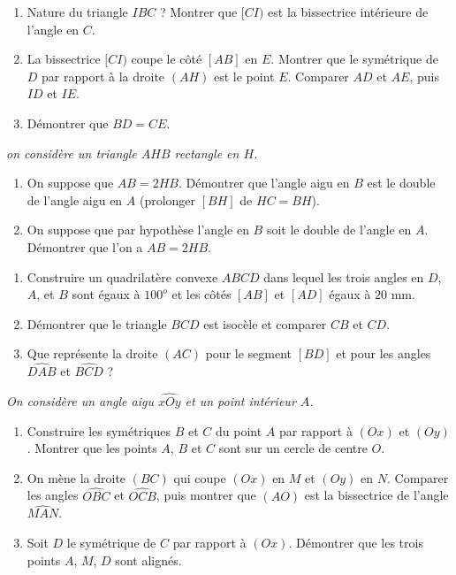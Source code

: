 \begin{itemize}
\begin{enumerate}
\item Nature du triangle $IBC$ ? Montrer que $[CI)$ est la bissectrice intérieure de l'angle en $C$. 
\item La bissectrice $[CI)$ coupe le côté $[AB]$ en $E$. Montrer que le symétrique de $D$ par rapport à la droite $(AH)$ est le point $E$. Comparer $AD$ et $AE$, puis $ID$ et $IE$. 
\item Démontrer que $BD=CE$.
\end{enumerate}
\it on considère un triangle $AHB$ rectangle en $H$. 
\begin{enumerate}
\item On suppose que $AB=2HB$. Démontrer que l'angle aigu en $B$ est le double de l'angle aigu en $A$ (prolonger $[BH]$ de $HC=BH$).
\item On suppose que par hypothèse l'angle en $B$ soit le double de l'angle en $A$. Démontrer que l'on a $AB=2HB$.
\end{enumerate}
\it \begin{enumerate}
\item Construire un quadrilatère convexe $ABCD$ dans lequel les trois angles en $D$, $A$, et $B$ sont égaux à $100^o$ et les côtés $[AB]$ et $[AD]$ égaux à $20$ mm.
\item Démontrer que le triangle $BCD$ est isocèle et comparer $CB$ et $CD$.
\item Que représente la droite $(AC)$ pour le segment $[BD]$ et pour les angles $\widehat{DAB}$ et $\widehat{BCD}$ ?
\end{enumerate}
\it On considère un angle aigu $\widehat{xOy}$ et un point intérieur $A$. \begin{enumerate}
\item Construire les symétriques $B$ et $C$ du point $A$ par rapport à $(Ox)$ et $(Oy)$. Montrer que les points $A$, $B$ et $C$ sont sur un cercle de centre $O$.
\item On mène la droite $(BC)$ qui coupe $(Ox)$ en $M$
et $(Oy)$ en $N$. Comparer les angles $\widehat{OBC}$
et $\widehat{OCB}$, puis montrer que $(AO)$ est la bissectrice de l'angle $\widehat{MAN}$.
\item Soit $D$ le symétrique de $C$ par rapport à $(Ox)$. Démontrer que les trois points $A$, $M$, $D$ sont alignés.
\end{enumerate}



\end{itemize}